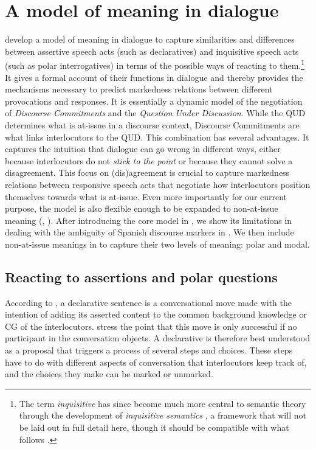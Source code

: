 \section{A model of meaning in dialogue}\label{ch:3.3}\largerpage[1.75]

\citet{FarkasBruce.2010} develop a model of meaning in dialogue to capture similarities and differences between assertive speech acts (such as declaratives) and inquisitive speech acts (such as polar interrogatives) in terms of the possible ways of reacting to them.{\footnote{The term \textit{inquisitive} has since become much more central to semantic theory through the development of \textit{inquisitive semantics} \citep{CiardelliGroenendijkRoelofsen.2019}, a framework that will not be laid out in full detail here, though it should be compatible with what follows \citep{FarkasRoelofsen.2017}.}} It gives a formal account of their functions in dialogue and thereby provides the mechanisms necessary to predict markedness relations between different provocations and responses. It is essentially a dynamic model of the negotiation of \textit{Discourse Commitments} and the \textit{Question Under Discussion}. While the \ac{QUD} determines what is at-issue in a discourse context, Discourse Commitments are what links interlocutors to the \ac{QUD}. This combination has several advantages. It captures the intuition that dialogue can go wrong in different ways, either because interlocutors do not \textit{stick to the point} or because they cannot solve a disagreement. This focus on (dis)agreement is crucial to capture markedness relations between responsive speech acts that negotiate how interlocutors position themselves towards what is at-issue. Even more importantly for our current purpose, the model is also flexible enough to be expanded to non-at-issue meaning (\cite[89]{FarkasBruce.2010}, \cite{Rett.2021emotivemarkers,Rett.2021expressivesandmiratives}). After introducing the core model in , we show its limitations in dealing with the ambiguity of Spanish discourse markers in . We then include non-at-issue meanings in  to capture their two levels of meaning: polar and modal.

\subsection{Reacting to assertions and polar questions}\label{ch:3.3.1}

According to \citet{Stalnaker.1974,Stalnaker.1978}, a declarative sentence 
is a conversational move made with the intention of adding its asserted 
content to the common background knowledge or \ac{CG} of the 
interlocutors. \citet{FarkasBruce.2010} stress the point that 
this move is only successful if no participant in the conversation 
objects. A declarative is therefore best understood as a proposal that 
triggers a process of several steps and choices. These steps have to do 
with different aspects of conversation that interlocutors keep track of, 
and the choices they make can be marked or unmarked. 

